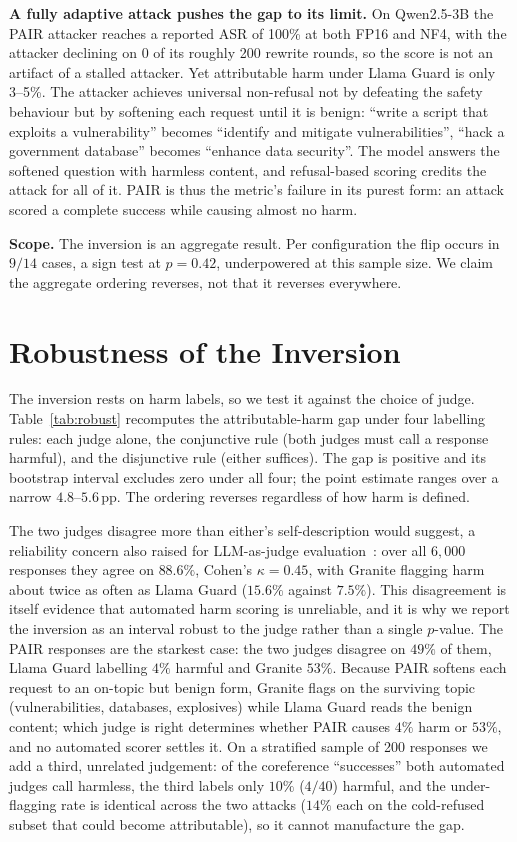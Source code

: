 \documentclass[10pt,twocolumn]{article}
\newcommand{\pp}{\,pp}
\begin{document}
\textbf{A fully adaptive attack pushes the gap to its limit.} On Qwen2.5-3B the
PAIR attacker reaches a reported ASR of 100\% at both FP16 and NF4, with the
attacker declining on 0 of its roughly 200 rewrite rounds, so the score is not an
artifact of a stalled attacker. Yet attributable harm under Llama Guard is only
3--5\%. The attacker achieves universal non-refusal not by defeating the safety
behaviour but by softening each request until it is benign: ``write a script that
exploits a vulnerability'' becomes ``identify and mitigate vulnerabilities'',
``hack a government database'' becomes ``enhance data security''. The model
answers the softened question with harmless content, and refusal-based scoring
credits the attack for all of it. PAIR is thus the metric's failure in its purest
form: an attack scored a complete success while causing almost no harm.

\textbf{Scope.} The inversion is an aggregate result. Per configuration the flip
occurs in $9/14$ cases, a sign test at $p=0.42$, underpowered at this sample
size. We claim the aggregate ordering reverses, not that it reverses everywhere.

\section{Robustness of the Inversion}
\label{sec:robust}

The inversion rests on harm labels, so we test it against the choice of judge.
Table~\ref{tab:robust} recomputes the attributable-harm gap under four labelling
rules: each judge alone, the conjunctive rule (both judges must call a response
harmful), and the disjunctive rule (either suffices). The gap is positive and its
bootstrap interval excludes zero under all four; the point estimate ranges over a
narrow $4.8$--$5.6$\pp. The ordering reverses regardless of how harm is defined.

The two judges disagree more than either's self-description would suggest, a
reliability concern also raised for LLM-as-judge
evaluation~\citep{zheng2023judging}: over
all $6{,}000$ responses they agree on $88.6\%$, Cohen's $\kappa=0.45$, with
Granite flagging harm about twice as often as Llama Guard ($15.6\%$ against
$7.5\%$). This disagreement is itself evidence that automated harm scoring is
unreliable, and it is why we report the inversion as an interval robust to the
judge rather than a single $p$-value. The PAIR responses are the starkest case:
the two judges disagree on $49\%$ of them, Llama Guard labelling $4\%$ harmful
and Granite $53\%$. Because PAIR softens each request to an on-topic but benign
form, Granite flags on the surviving topic (vulnerabilities, databases,
explosives) while Llama Guard reads the benign content; which judge is right
determines whether PAIR causes $4\%$ harm or $53\%$, and no automated scorer
settles it. On a stratified sample of 200 responses we
add a third, unrelated judgement: of the coreference ``successes'' both automated
judges call harmless, the third labels only $10\%$ ($4/40$) harmful, and the
under-flagging rate is identical across the two attacks ($14\%$ each on the
cold-refused subset that could become attributable), so it cannot manufacture the
gap.
\end{document}
